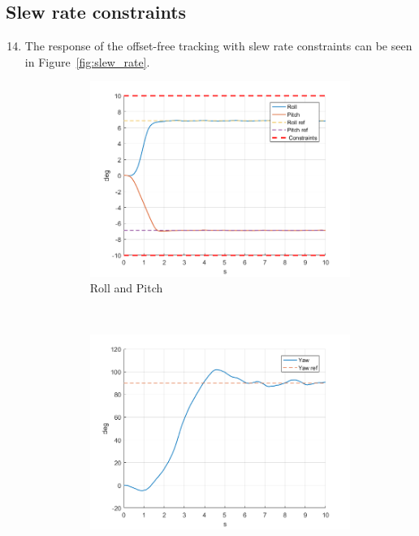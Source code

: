 \documentclass[11pt]{article}
\begin{document}


\subsection*{Slew rate constraints} %
\label{sub:slew_rate_constraints}

\begin{enumerate}
    \setcounter{enumi}{13}
    \item The response of the offset-free tracking with slew rate constraints can be
    seen in Figure~\ref{fig:slew_rate}.
    \begin{figure}[ht]
        \centering
        \begin{subfigure}[c]{0.3\linewidth}
            \centering
            \includegraphics[width=\linewidth]{Plots_14_SlewRateConstraints/01}
            \caption{Roll and Pitch}
        \end{subfigure}
        ~
        \begin{subfigure}[c]{0.3\linewidth}
            \centering
            \includegraphics[width=\linewidth]{Plots_14_SlewRateConstraints/02}

\end{subfigure}
\end{figure}
\end{enumerate}
\end{document}

